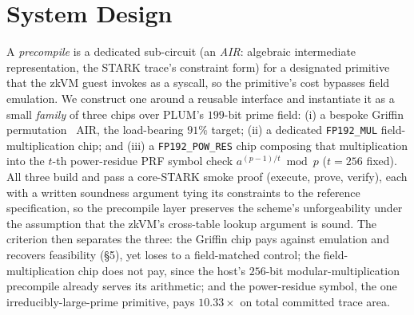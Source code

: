 \section{System Design}
A \emph{precompile} is a dedicated sub-circuit (an \emph{AIR}: algebraic intermediate representation, the STARK trace's constraint form) for a designated primitive that the zkVM guest invokes as a syscall, so the primitive's cost bypasses field emulation. We construct one around a reusable interface and instantiate it as a small \emph{family} of three chips over PLUM's $199$-bit prime field: (i) a bespoke Griffin permutation~\cite{cryptoeprint:2022/403} AIR, the load-bearing $91\%$ target; (ii) a dedicated \texttt{FP192\_MUL} field-multiplication chip; and (iii) a \texttt{FP192\_POW\_RES} chip composing that multiplication into the $t$-th power-residue PRF symbol check $a^{(p-1)/t}\bmod p$ ($t=256$ fixed). All three build and pass a core-STARK smoke proof (execute, prove, verify), each with a written soundness argument tying its constraints to the reference specification, so the precompile layer preserves the scheme's unforgeability under the assumption that the zkVM's cross-table lookup argument is sound. The criterion then separates the three: the Griffin chip pays against emulation and recovers feasibility (\S5), yet loses to a field-matched control; the field-multiplication chip does not pay, since the host's $256$-bit modular-multiplication precompile already serves its arithmetic; and the power-residue symbol, the one irreducibly-large-prime primitive, pays $10.33\times$ on total committed trace area.
